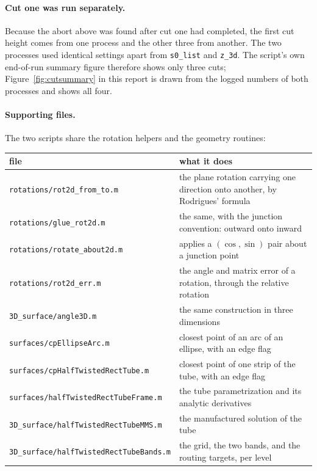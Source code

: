 \paragraph{Cut one was run separately.} Because the abort above was found
after cut one had completed, the first cut height comes from one process
and the other three from another. The two processes used identical
settings apart from \texttt{s0\_list} and \texttt{z\_3d}. The script's
own end-of-run summary figure therefore shows only three cuts;
Figure~\ref{fig:cutsummary} in this report is drawn from the logged
numbers of both processes and shows all four.

\paragraph{Supporting files.} The two scripts share the rotation
helpers and the geometry routines:

\begin{center}
\begin{tabular}{@{}ll@{}}
  \toprule
  file & what it does \\
  \midrule
  \texttt{rotations/rot2d\_from\_to.m}
    & the plane rotation carrying one direction onto another, by
      Rodrigues' formula \\
  \texttt{rotations/glue\_rot2d.m}
    & the same, with the junction convention: outward onto inward \\
  \texttt{rotations/rotate\_about2d.m}
    & applies a $(\cos,\sin)$ pair about a junction point \\
  \texttt{rotations/rot2d\_err.m}
    & the angle and matrix error of a rotation, through the relative
      rotation \\
  \texttt{3D\_surface/angle3D.m}
    & the same construction in three dimensions \\
  \texttt{surfaces/cpEllipseArc.m}
    & closest point of an arc of an ellipse, with an edge flag \\
  \texttt{surfaces/cpHalfTwistedRectTube.m}
    & closest point of one strip of the tube, with an edge flag \\
  \texttt{surfaces/halfTwistedRectTubeFrame.m}
    & the tube parametrization and its analytic derivatives \\
  \texttt{3D\_surface/halfTwistedRectTubeMMS.m}
    & the manufactured solution of the tube \\
  \texttt{3D\_surface/halfTwistedRectTubeBands.m}
    & the grid, the two bands, and the routing targets, per level \\
  \bottomrule
\end{tabular}
\end{center}

